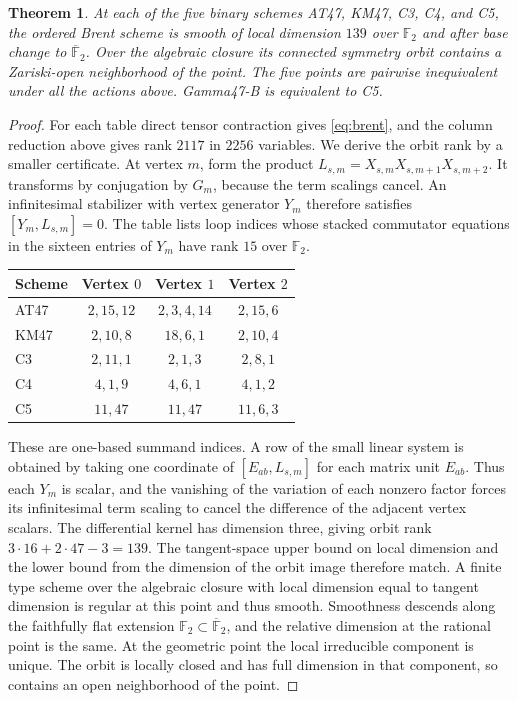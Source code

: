 \documentclass[11pt,reqno]{amsart}
\newcommand{\F}{\mathbb F}
\newtheorem{theorem}{Theorem}[section]
\begin{document}
\begin{theorem}\label{thm:rigid}
At each of the five binary schemes AT47, KM47, C3, C4, and C5, the ordered Brent scheme is smooth of local dimension \(139\) over \(\F_2\) and after base change to \(\overline{\F}_2\). Over the algebraic closure its connected symmetry orbit contains a Zariski-open neighborhood of the point. The five points are pairwise inequivalent under all the actions above. Gamma47-B is equivalent to C5.
\end{theorem}
\begin{proof}
For each table direct tensor contraction gives \eqref{eq:brent}, and the column reduction above gives rank \(2117\) in \(2256\) variables. We derive the orbit rank by a smaller certificate. At vertex \(m\), form the product \(L_{s,m}=X_{s,m}X_{s,m+1}X_{s,m+2}\). It transforms by conjugation by \(G_m\), because the term scalings cancel. An infinitesimal stabilizer with vertex generator \(Y_m\) therefore satisfies \([Y_m,L_{s,m}]=0\). The table lists loop indices whose stacked commutator equations in the sixteen entries of \(Y_m\) have rank \(15\) over \(\F_2\).
\begin{center}
\small
\begin{tabular}{@{}lccc@{}}
\toprule
Scheme & Vertex \(0\) & Vertex \(1\) & Vertex \(2\)\\
\midrule
AT47 & \(2,15,12\) & \(2,3,4,14\) & \(2,15,6\)\\
KM47 & \(2,10,8\) & \(18,6,1\) & \(2,10,4\)\\
C3 & \(2,11,1\) & \(2,1,3\) & \(2,8,1\)\\
C4 & \(4,1,9\) & \(4,6,1\) & \(4,1,2\)\\
C5 & \(11,47\) & \(11,47\) & \(11,6,3\)\\
\bottomrule
\end{tabular}
\end{center}
These are one-based summand indices. A row of the small linear system is obtained by taking one coordinate of \([E_{ab},L_{s,m}]\) for each matrix unit \(E_{ab}\). Thus each \(Y_m\) is scalar, and the vanishing of the variation of each nonzero factor forces its infinitesimal term scaling to cancel the difference of the adjacent vertex scalars. The differential kernel has dimension three, giving orbit rank \(3\cdot16+2\cdot47-3=139\). The tangent-space upper bound on local dimension and the lower bound from the dimension of the orbit image therefore match. A finite type scheme over the algebraic closure with local dimension equal to tangent dimension is regular at this point and thus smooth. Smoothness descends along the faithfully flat extension \(\F_2\subset\overline{\F}_2\), and the relative dimension at the rational point is the same. At the geometric point the local irreducible component is unique. The orbit is locally closed and has full dimension in that component, so contains an open neighborhood of the point.


\end{proof}
\end{document}
